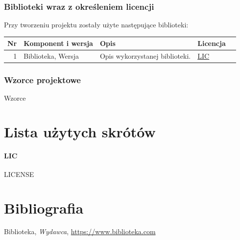 \documentclass[10pt,a4paper]{article}
\begin{document}
\subsubsection{Biblioteki wraz z określeniem licencji}
Przy tworzeniu projektu zostały użyte następujące biblioteki:

\begin{table}[H]
	\begin{tabularx}{\textwidth}{|r|l|X|l|c|}
		\hline
		\textbf{Nr} & \textbf{Komponent i wersja} & \textbf{Opis} & \textbf{Licencja} & \\
		\hline
		1 & 
		Biblioteka, Wersja &
		Opis wykorzystanej biblioteki. &
		\mbox{\hyperref[abbr:lic]{LIC}} &
		\cite{bib} \\
		\hline
	\end{tabularx}
\end{table}

\subsubsection{Wzorce projektowe}
Wzorce

\newpage
\section{Lista użytych skrótów}
\label{abbr:lic}
\paragraph{LIC} LICENSE

\renewcommand*{\refname}{\vspace*{-2em}}
\section{Bibliografia}
\begin{thebibliography}{99}
		Biblioteka,
		\emph{Wydawca},
		\url{https://www.biblioteka.com}
\end{thebibliography}
\end{document}
